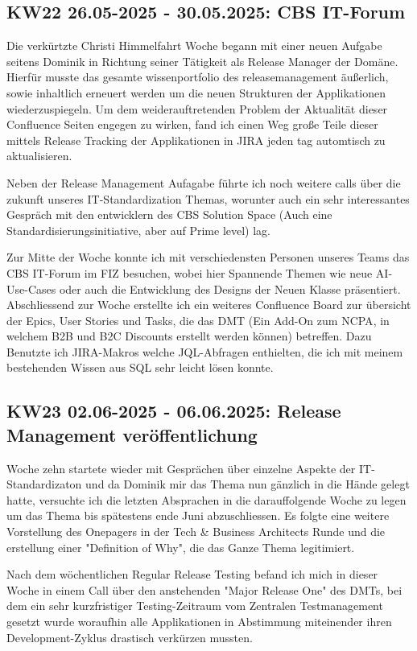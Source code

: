 \subsection{KW22 26.05-2025 - 30.05.2025: CBS IT-Forum}
Die verkürtzte Christi Himmelfahrt Woche begann mit einer neuen Aufgabe seitens Dominik in Richtung seiner Tätigkeit als Release Manager der Domäne. 
Hierfür musste das gesamte wissenportfolio des releasemanagement äußerlich, sowie inhaltlich erneuert werden um die neuen Strukturen der Applikationen wiederzuspiegeln.
Um dem weiderauftretenden Problem der Aktualität dieser Confluence Seiten engegen zu wirken, fand ich einen Weg große Teile dieser mittels Release Tracking der Applikationen in JIRA jeden tag automtisch zu aktualisieren.

Neben der Release Management Aufagabe führte ich noch weitere calls über die zukunft unseres IT-Standardization Themas, worunter auch ein sehr interessantes Gespräch mit den entwicklern des CBS Solution Space (Auch eine Standardisierungsinitiative, aber auf Prime level) lag.

Zur Mitte der Woche konnte ich mit verschiedensten Personen unseres Teams das CBS IT-Forum im \ac{FIZ} besuchen, wobei hier Spannende Themen wie neue AI-Use-Cases oder auch die Entwicklung des Designs der Neuen Klasse präsentiert.
Abschliessend zur Woche erstellte ich ein weiteres Confluence Board zur übersicht der Epics, User Stories und Tasks, die das \ac{DMT} (Ein Add-On zum \ac{NCPA}, in welchem B2B und B2C Discounts erstellt werden können) betreffen. 
Dazu Benutzte ich JIRA-Makros welche \ac{JQL}-Abfragen enthielten, die ich mit meinem bestehenden Wissen aus \ac{SQL} sehr leicht lösen konnte. 


\subsection{KW23 02.06-2025 - 06.06.2025: Release Management veröffentlichung}
Woche zehn startete wieder mit Gesprächen über einzelne Aspekte der IT-Standardizaton und da Dominik mir das Thema nun gänzlich in die Hände gelegt hatte, versuchte ich die letzten Absprachen in die darauffolgende Woche zu legen um das Thema bis spätestens ende Juni abzuschliessen.
Es folgte eine weitere Vorstellung des Onepagers in der Tech \& Business Architects Runde und die erstellung einer "Definition of Why", die das Ganze Thema legitimiert.

Nach dem wöchentlichen Regular Release Testing befand ich mich in dieser Woche in einem Call über den anstehenden "Major Release One" des \acp{DMT}, bei dem ein sehr kurzfristiger Testing-Zeitraum vom Zentralen Testmanagement gesetzt wurde woraufhin alle Applikationen in Abstimmung miteinender ihren Development-Zyklus drastisch verkürzen mussten.


